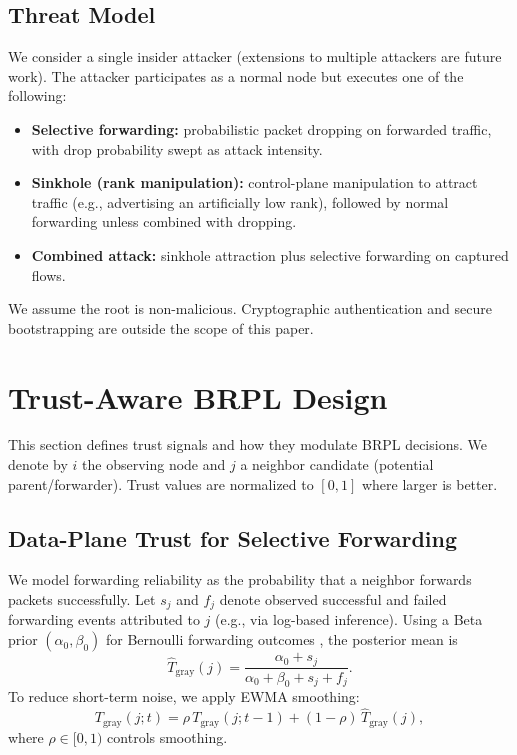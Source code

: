 \documentclass[11pt,a4paper]{article}
\begin{document}
\subsection{Threat Model}
We consider a single insider attacker (extensions to multiple attackers are future work). The attacker participates as a normal node but executes one of the following:
\begin{itemize}[leftmargin=*]
  \item \textbf{Selective forwarding:} probabilistic packet dropping on forwarded traffic, with drop probability swept as attack intensity.
  \item \textbf{Sinkhole (rank manipulation):} control-plane manipulation to attract traffic (e.g., advertising an artificially low rank), followed by normal forwarding unless combined with dropping.
  \item \textbf{Combined attack:} sinkhole attraction plus selective forwarding on captured flows.
\end{itemize}
We assume the root is non-malicious. Cryptographic authentication and secure bootstrapping are outside the scope of this paper.

\section{Trust-Aware BRPL Design}
\label{sec:design}
This section defines trust signals and how they modulate BRPL decisions. We denote by $i$ the observing node and $j$ a neighbor candidate (potential parent/forwarder). Trust values are normalized to $[0,1]$ where larger is better.

\subsection{Data-Plane Trust for Selective Forwarding}
\label{subsec:grayhole}
We model forwarding reliability as the probability that a neighbor forwards packets successfully. Let $s_j$ and $f_j$ denote observed successful and failed forwarding events attributed to $j$ (e.g., via log-based inference). Using a Beta prior $(\alpha_0,\beta_0)$ for Bernoulli forwarding outcomes \citep{ganeriwal2004reputation,ganeriwal2008tosn}, the posterior mean is
\begin{equation}
\hat{T}_{\text{gray}}(j)=\frac{\alpha_0+s_j}{\alpha_0+\beta_0+s_j+f_j}.
\end{equation}
To reduce short-term noise, we apply EWMA smoothing:
\begin{equation}
T_{\text{gray}}(j;t)=\rho\,T_{\text{gray}}(j;t\!-\!1)+(1-\rho)\,\hat{T}_{\text{gray}}(j),
\end{equation}
where $\rho\in[0,1)$ controls smoothing.
\end{document}
